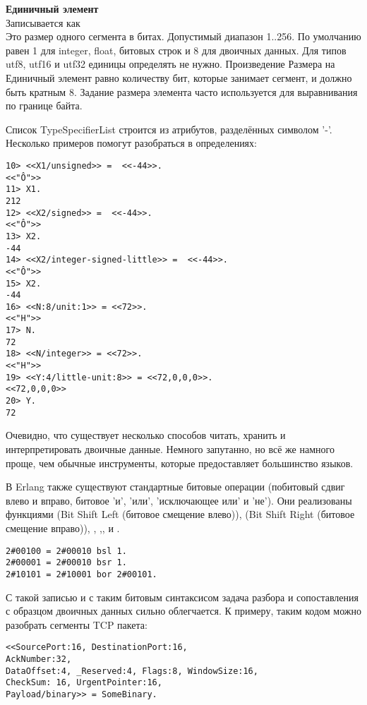 \begin{minipage}{\textwidth}
    \textbf{Единичный элемент}\\ 
    Записывается как \\ 
    Это размер одного сегмента в битах.
    Допустимый диапазон 1..256. По умолчанию равен 1 для integer, float, битовых строк и 8 для двоичных данных.
    Для типов utf8, utf16 и utf32 единицы определять не нужно.
    Произведение Размера на Единичный элемент равно количеству бит, которые занимает сегмент, и должно быть кратным 8.
    Задание размера элемента часто используется для выравнивания по границе байта.\\  
\end{minipage}

Список TypeSpecifierList строится из атрибутов, разделённых символом '\--'.\\ 

Несколько примеров помогут разобраться в определениях:
\begin{lstlisting}[style=repl]
10> <<X1/unsigned>> =  <<-44>>.
<<"Ô">>
11> X1.
212
12> <<X2/signed>> =  <<-44>>. 
<<"Ô">>
13> X2.
-44
14> <<X2/integer-signed-little>> =  <<-44>>.
<<"Ô">>
15> X2.
-44
16> <<N:8/unit:1>> = <<72>>.
<<"H">>
17> N.
72
18> <<N/integer>> = <<72>>.
<<"H">>
19> <<Y:4/little-unit:8>> = <<72,0,0,0>>.     
<<72,0,0,0>>
20> Y.
72
\end{lstlisting}

Очевидно, что существует несколько способов читать, хранить и интерпретировать двоичные данные.
Немного запутанно, но всё же намного проще, чем обычные инструменты, которые предоставляет большинство языков.

В Erlang также существуют стандартные битовые операции (побитовый сдвиг влево и вправо, битовое 'и', 'или', 'исключающее или' и 'не').
Они реализованы функциями  (Bit Shift Left (битовое смещение влево)),  (Bit Shift Right (битовое смещение вправо)), , ,, и .
\begin{lstlisting}[style=repl]
2#00100 = 2#00010 bsl 1.
2#00001 = 2#00010 bsr 1.
2#10101 = 2#10001 bor 2#00101.
\end{lstlisting}

С такой записью и с таким битовым синтаксисом задача разбора и сопоставления с образцом двоичных данных сильно облегчается.
К примеру, таким кодом можно разобрать сегменты TCP пакета:
\begin{lstlisting}[style=repl]
<<SourcePort:16, DestinationPort:16,
AckNumber:32,
DataOffset:4, _Reserved:4, Flags:8, WindowSize:16,
CheckSum: 16, UrgentPointer:16,
Payload/binary>> = SomeBinary.
\end{lstlisting}

